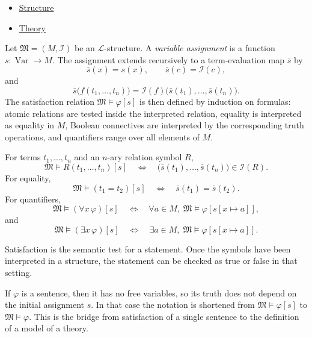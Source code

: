 \begin{dependencies}
\begin{itemize}
  \item \hyperref[def:axiom-systems-structure]{Structure}
  \item \hyperref[def:axiom-systems-theory]{Theory}
\end{itemize}
\end{dependencies}

\begin{definition}[Satisfaction]
\label{def:axiom-systems-satisfaction}
Let $\mathfrak{M}=(M,\mathcal{I})$ be an $\mathcal{L}$-structure. A
\emph{variable assignment} is a function $s:\operatorname{Var}\to M$. The
assignment extends recursively to a term-evaluation map $\bar{s}$ by
\[
  \bar{s}(x)=s(x),\qquad
  \bar{s}(c)=\mathcal{I}(c),
\]
and
\[
  \bar{s}\bigl(f(t_1,\ldots,t_n)\bigr)
  =
  \mathcal{I}(f)\bigl(\bar{s}(t_1),\ldots,\bar{s}(t_n)\bigr).
\]
The satisfaction relation $\mathfrak{M}\vDash\varphi[s]$ is then defined by
induction on formulas: atomic relations are tested inside the interpreted
relation, equality is interpreted as equality in $M$, Boolean connectives are
interpreted by the corresponding truth operations, and quantifiers range over
all elements of $M$.
\end{definition}

\begin{remark*}
For terms $t_1,\ldots,t_n$ and an $n$-ary relation symbol $R$,
\[
  \mathfrak{M}\vDash R(t_1,\ldots,t_n)[s]
  \quad\Longleftrightarrow\quad
  \bigl(\bar{s}(t_1),\ldots,\bar{s}(t_n)\bigr)\in\mathcal{I}(R).
\]
For equality,
\[
  \mathfrak{M}\vDash (t_1=t_2)[s]
  \quad\Longleftrightarrow\quad
  \bar{s}(t_1)=\bar{s}(t_2).
\]
For quantifiers,
\[
  \mathfrak{M}\vDash(\forall x\,\varphi)[s]
  \quad\Longleftrightarrow\quad
  \forall a\in M,\; \mathfrak{M}\vDash\varphi[s[x\mapsto a]],
\]
and
\[
  \mathfrak{M}\vDash(\exists x\,\varphi)[s]
  \quad\Longleftrightarrow\quad
  \exists a\in M,\; \mathfrak{M}\vDash\varphi[s[x\mapsto a]].
\]
\end{remark*}

\begin{remark*}[Interpretation]
Satisfaction is the semantic test for a statement. Once the symbols have been
interpreted in a structure, the statement can be checked as true or false in
that setting.
\end{remark*}

\begin{remark*}[Sentences]
If $\varphi$ is a sentence, then it has no free variables, so its truth does
not depend on the initial assignment $s$. In that case the notation is
shortened from $\mathfrak{M}\vDash\varphi[s]$ to $\mathfrak{M}\vDash\varphi$.
This is the bridge from satisfaction of a single sentence to the definition of
a model of a theory.
\end{remark*}

